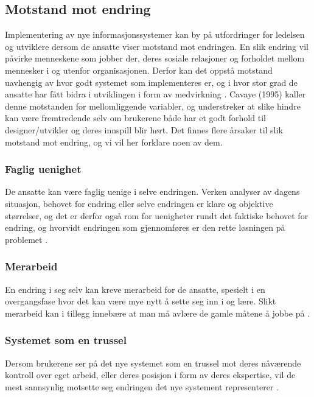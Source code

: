 \subsection{Motstand mot endring}
\label{chp: motstand}

Implementering av nye informasjonssystemer kan by på utfordringer for ledelsen og utviklere dersom de ansatte viser motstand mot endringen. 
En slik endring vil påvirke menneskene som jobber der, deres sosiale relasjoner og forholdet mellom mennesker i og utenfor organisasjonen. Derfor kan det oppstå motstand uavhengig av hvor godt systemet som implementeres er, og i hvor stor grad de ansatte har fått bidra i utviklingen i form av medvirkning \cite{Jacobsen12}. Cavaye (1995) kaller denne motstanden for mellomliggende variabler, og understreker at slike hindre kan være fremtredende selv om brukerene både har et godt forhold til designer/utvikler og deres innspill blir hørt. Det finnes flere årsaker til slik motstand mot endring, og vi vil her forklare noen av dem. 

\subsubsection{Faglig uenighet}
De ansatte kan være faglig uenige i selve endringen. Verken analyser av dagens situasjon, behovet for endring eller selve endringen er klare og objektive størrelser, og det er derfor også rom for uenigheter rundt det faktiske behovet for endring, og hvorvidt endringen som gjennomføres er den rette løsningen på problemet \cite{Jacobsen12}.

\subsubsection{Merarbeid}
En endring i seg selv kan kreve merarbeid for de ansatte, spesielt i en overgangsfase hvor det kan være mye nytt å sette seg inn i og lære. Slikt merarbeid kan i tillegg innebære at man må avlære de gamle måtene å jobbe på \cite{Jacobsen12}.

\subsubsection{Systemet som en trussel}
Dersom brukerene ser på det nye systemet som en trussel mot deres nåværende kontroll over eget arbeid, eller deres posisjon i form av deres ekspertise, vil de mest sannsynlig motsette seg endringen det nye systement representerer \cite{Cavaye95}.

